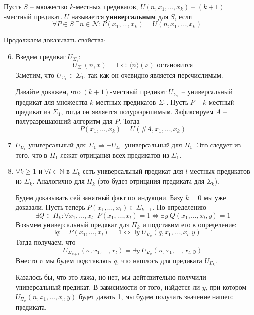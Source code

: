 \begin{conj}
    Пусть $S$ -- множество $k$-местных предикатов, $U(n, x_1, \dots, x_k)$ -- $(k+1)$-местный предикат. $U$ называется \textbf{универсальным} для $S$, если \[ \forall P \in S \; \exists n \in \mathcal{N} : P(x_1, \dots, x_k) = U(n, x_1, \dots, x_k) \]
\end{conj}

Продолжаем доказывать свойства: \begin{enumerate}
    \setcounter{enumi}{5}
    \item Введем предикат $U_{\Sigma_1}$: \[ U_{\Sigma_1}(n, \bar{x}) = 1 \Leftrightarrow \langle n \rangle (x) \text{ остановится} \]
    Заметим, что $U_{\Sigma_1} \in \Sigma_1$, так как он очевидно является перечислимым.

    Давайте докажем, что $(k+1)$-местный предикат $U_{\Sigma_1}$ -- универсальный предикат для множества $k$-местных предикатов $\Sigma_1$. Пусть $P$ -- $k$-местный предикат из $\Sigma_1$, тогда он является полуразрешимым. Зафиксируем $A$ -- полуразрешающий алгоритм для $P$. Тогда \[ P(x_1, \dots, x_k) = U(\#A, x_1, \dots, x_k) \]

    \item $U_{\Sigma_1}$ универсальный для $\Sigma_1 \Longrightarrow \lnot U_{\Sigma_1}$ универсальный для $\Pi_1$. Это следует из того, что в $\Pi_1$ лежат отрицания всех предикатов из $\Sigma_1$.
    \item $\forall k \geqslant 1$ и $\forall l \in \mathbb{N}$ в $\Sigma_k$ есть универсальный предикат для $l$-местных предикатов из $\Sigma_k$. Аналогично для $\Pi_k$ (это будет отрицания предиката для $\Sigma_k$).
    
    Будем доказывать сей занятный факт по индукции. Базу $k = 0$ мы уже доказали. Пусть теперь $P(x_1, \dots, x_l) \in \Sigma_{k+1}$. По определению \[ \exists Q \in \Pi_k : \forall x_1, \dots, x_l \;\; P(x_1, \dots, x_l) = 1 \Leftrightarrow \exists y \; Q(x_1, \dots, x_l, y) = 1 \] Возьмем универсальный предикат для $\Pi_k$ и подставим его в определение: \[ \exists q : \quad P(x_1, \dots, x_l) = 1 \Leftrightarrow \exists y \; U_{\Pi_k}(q, x_1, \dots, x_l, y) = 1 \] Тогда получаем, что \[ U_{\Sigma_{k+1}}(n, x_1, \dots, x_l) =   \exists y \; U_{\Pi_k}(n, x_1, \dots, x_l, y) \] Вместо $n$ мы будем подставлять $q$, что нашлось для предиката $U_{\Pi_k}$. 

    Казалось бы, что это лажа, но нет, мы дейтсвительно получили универсальный предикат. В зависимости от того, найдется ли $y$, при котором $U_{\Pi_k}(n, x_1, \dots, x_l, y)$ будет давать 1, мы будем получать значение нашего предиката.


\end{enumerate}
